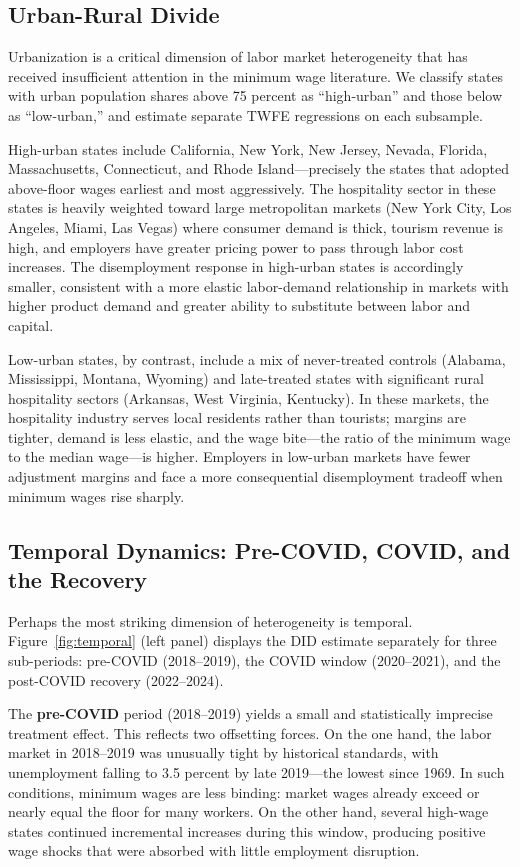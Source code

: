\documentclass[12pt]{article}
\begin{document}
\subsection{Urban-Rural Divide}

Urbanization is a critical dimension of labor market heterogeneity that has
received insufficient attention in the minimum wage literature.  We classify
states with urban population shares above 75 percent as ``high-urban'' and
those below as ``low-urban,'' and estimate separate TWFE regressions on each
subsample.

High-urban states include California, New York, New Jersey, Nevada, Florida,
Massachusetts, Connecticut, and Rhode Island---precisely the states that
adopted above-floor wages earliest and most aggressively.  The hospitality
sector in these states is heavily weighted toward large metropolitan markets
(New York City, Los Angeles, Miami, Las Vegas) where consumer demand is thick,
tourism revenue is high, and employers have greater pricing power to pass
through labor cost increases.  The disemployment response in high-urban states
is accordingly smaller, consistent with a more elastic labor-demand relationship
in markets with higher product demand and greater ability to substitute between
labor and capital.

Low-urban states, by contrast, include a mix of never-treated controls
(Alabama, Mississippi, Montana, Wyoming) and late-treated states with
significant rural hospitality sectors (Arkansas, West Virginia, Kentucky).
In these markets, the hospitality industry serves local residents rather than
tourists; margins are tighter, demand is less elastic, and the wage bite---the
ratio of the minimum wage to the median wage---is higher.  Employers in low-urban
markets have fewer adjustment margins and face a more consequential disemployment
tradeoff when minimum wages rise sharply.

\subsection{Temporal Dynamics: Pre-COVID, COVID, and the Recovery}

Perhaps the most striking dimension of heterogeneity is temporal.
Figure~\ref{fig:temporal} (left panel) displays the DID estimate separately
for three sub-periods: pre-COVID (2018--2019), the COVID window (2020--2021),
and the post-COVID recovery (2022--2024).

The \textbf{pre-COVID} period (2018--2019) yields a small and statistically
imprecise treatment effect.  This reflects two offsetting forces.  On the one
hand, the labor market in 2018--2019 was unusually tight by historical
standards, with unemployment falling to 3.5 percent by late 2019---the lowest
since 1969.  In such conditions, minimum wages are less binding: market wages
already exceed or nearly equal the floor for many workers.  On the other hand,
several high-wage states continued incremental increases during this window,
producing positive wage shocks that were absorbed with little employment
disruption.
\end{document}
